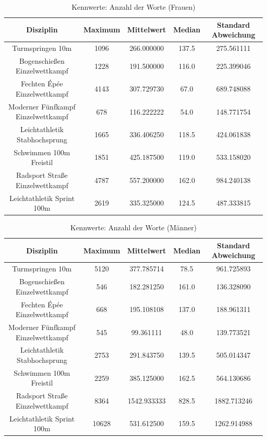 \documentclass[11pt]{article}
\begin{document}
\begin{table}
\caption{\label{tab:wordcount_kpi_women}Kennwerte: Anzahl der Worte (Frauen)}
\centering
\begin{tabular}{ c|c|c|c|c }
  Disziplin & Maximum & Mittelwert & Median & Standard Abweichung \\
  \hline
  Turmspringen 10m & 1096 & 266.000000 & 137.5 & 275.561111\\
  Bogenschießen Einzelwettkampf & 1228 & 191.500000 & 116.0 & 225.399046\\
  Fechten Épée Einzelwettkampf & 4143& 307.729730 & 67.0 & 689.748088\\
  Moderner Fünfkampf Einzelwettkampf & 678& 116.222222 & 54.0& 148.771754\\
  Leichtathletik Stabhochsprung & 1665 & 336.406250 & 118.5 & 424.061838\\
  Schwimmen 100m Freistil & 1851 & 425.187500 & 119.0 & 533.158020\\
  Radsport Straße Einzelwettkampf & 4787& 557.200000 & 162.0 & 984.240138\\
  Leichtathletik Sprint 100m & 2619& 335.325000 & 124.5& 487.333815\\
\end{tabular}
\end{table}

\begin{table}
\caption{\label{tab:wordcount_kpi_men}Kennwerte: Anzahl der Worte (Männer)}
\centering
\begin{tabular}{ c|c|c|c|c }
  Disziplin & Maximum & Mittelwert & Median & Standard Abweichung \\
  \hline
  Turmspringen 10m & 5120 & 377.785714 & 78.5 & 961.725893\\
  Bogenschießen Einzelwettkampf & 546 & 182.281250 & 161.0 & 136.328090\\
  Fechten Épée Einzelwettkampf & 668 & 195.108108 & 137.0 & 188.961311\\
  Moderner Fünfkampf Einzelwettkampf & 545 & 99.361111 & 48.0 & 139.773521\\
  Leichtathletik Stabhochsprung & 2753 & 291.843750 & 139.5 & 505.014347\\
  Schwimmen 100m Freistil & 2259 & 385.125000 & 162.5 & 564.130686\\
  Radsport Straße Einzelwettkampf & 8364 & 1542.933333 & 828.5 & 1882.713246\\
  Leichtathletik Sprint 100m & 10628 & 531.612500 & 159.5 & 1262.914988\\
\end{tabular}
\end{table}
\end{document}
